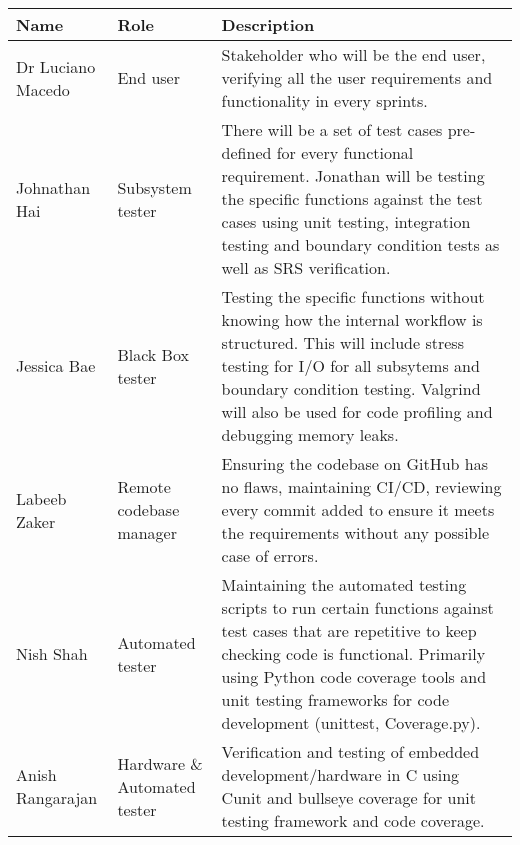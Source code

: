 \documentclass[12pt, titlepage]{article}
\begin{document}
\begin{center}
  \begin{tabular}{|m{5em}|m{5em}|m{25em}|}

    \hline
    \label{4_1}\textbf{Name} & \textbf{Role}                 & \textbf{Description}                                                                                                                                                                                                                                                \\
    \hline
    Dr Luciano Macedo        & End user                      & Stakeholder who will be the end user, verifying all the user requirements and functionality in every sprints.                                                                                                                                                       \\
    \hline
    Johnathan Hai            & Subsystem tester              & There will be a set of test cases pre-defined for every functional requirement. Jonathan will be testing the specific functions against the test cases using unit testing, integration testing and boundary condition tests as well as SRS verification.            \\
    \hline
    Jessica Bae              & Black Box tester              & Testing the specific functions without knowing how the internal workflow is structured. This will include stress testing for I/O for all subsytems and boundary condition testing. Valgrind will also be used for code profiling and debugging memory leaks.        \\
    \hline
    Labeeb Zaker             & Remote codebase manager       & Ensuring the codebase on GitHub has no flaws, maintaining CI/CD, reviewing every commit added to ensure it meets the requirements without any possible case of errors.                                                                                              \\
    \hline
    Nish Shah                & Automated tester              & Maintaining the automated testing scripts to run certain functions against test cases that are repetitive to keep checking code is functional. Primarily using Python code coverage tools and unit testing frameworks for code development (unittest, Coverage.py). \\
    \hline
    Anish Rangarajan         & Hardware \& Automated tester  & Verification and testing of embedded development/hardware in C using Cunit and bullseye coverage for unit testing framework and code coverage.                                                                                                                      \\

\end{tabular}
\end{center}
\end{document}
